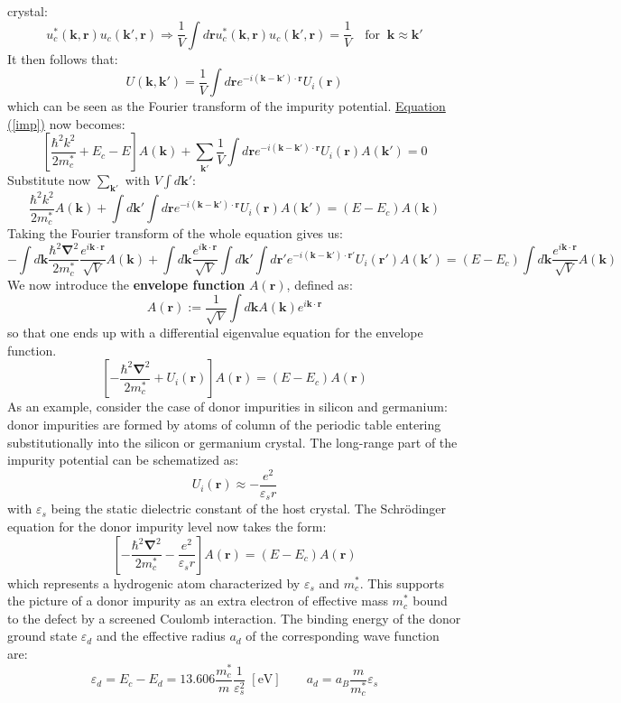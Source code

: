 \documentclass[10.75pt,a4paper,openright,bottom=2cm]{article}
\renewcommand{\Vec}[1]{\boldsymbol{#1}}
\renewcommand{\refeq}[1]{\hyperref[#1]{Equation (\ref{#1})}}
\newcommand{\RN}[1]{%
  \textup{\uppercase\expandafter{\romannumeral#1}}%
}
\begin{document}
crystal:
\[
u_c^*(\Vec{k},\Vec{r})u_c(\Vec{k'},\Vec{r})\Rightarrow\frac{1}{V}\int d\Vec{r}u_c^*(\Vec{k},\Vec{r})u_c(\Vec{k'},\Vec{r})=\frac{1}{V} \quad\text{for}\;\;\Vec{k}\approx\Vec{k'}
\]
It then follows that:
\[
U(\Vec{k},\Vec{k'})=\frac{1}{V}\int d\Vec{r}e^{-i(\Vec{k}-\Vec{k'})\cdot\Vec{r}}U_i(\Vec{r})
\]
which can be seen as the Fourier transform of the impurity potential. \refeq{imp} now becomes:
\[
\left[\frac{\hbar^2k^2}{2m_c^*}+E_c-E\right]A(\Vec{k})+\sum_{\Vec{k'}}\frac{1}{V}\int d\Vec{r}e^{-i(\Vec{k}-\Vec{k'})\cdot\Vec{r}}U_i(\Vec{r})A(\Vec{k'})=0
\]
Substitute now $\sum_{\Vec{k'}}$ with $V\int d\Vec{k'}$:
\[
\frac{\hbar^2k^2}{2m_c^*}A(\Vec{k})+\int d\Vec{k'}\int d\Vec{r}e^{-i(\Vec{k}-\Vec{k'})\cdot\Vec{r}}U_i(\Vec{r})A(\Vec{k'})=(E-E_c)A(\Vec{k})
\]
Taking the Fourier transform of the whole equation gives us:
\[
-\int d\Vec{k}\frac{\hbar^2\Vec{\nabla}^2}{2m_c^*}\frac{e^{i\Vec{k}\cdot\Vec{r}}}{\sqrt{V}}A(\Vec{k})+\int d\Vec{k}\frac{e^{i\Vec{k}\cdot\Vec{r}}}{\sqrt{V}}\int d\Vec{k'}\int d\Vec{r'}e^{-i(\Vec{k}-\Vec{k'})\cdot\Vec{r'}}U_i(\Vec{r'})A(\Vec{k'})=(E-E_c)\int d\Vec{k}\frac{e^{i\Vec{k}\cdot\Vec{r}}}{\sqrt{V}}A(\Vec{k})
\]
We now introduce the \textbf{envelope function} $A(\Vec{r})$, defined as:
\[
A(\Vec{r}):=\frac{1}{\sqrt{V}}\int d\Vec{k}A(\Vec{k})e^{i\Vec{k}\cdot\Vec{r}}
\]
so that one ends up with a differential eigenvalue equation for the envelope function.
\[
\left[-\frac{\hbar^2\Vec{\nabla}^2}{2m_c^*}+U_i(\Vec{r})\right]A(\Vec{r})=(E-E_c)A(\Vec{r})
\]
As an example, consider the case of donor impurities in silicon and germanium: donor impurities are formed by atoms of column \RN{5} of the periodic table entering substitutionally into the silicon or germanium crystal. The long-range part of the impurity potential can be schematized as:
\[
U_i(\Vec{r})\approx-\frac{e^2}{\varepsilon_sr}
\]
with $\varepsilon_s$ being the static dielectric constant of the host crystal. The Schr\"odinger equation for the donor impurity level now takes the form:
\[
\left[-\frac{\hbar^2\Vec{\nabla}^2}{2m_c^*}-\frac{e^2}{\varepsilon_sr}\right]A(\Vec{r})=(E-E_c)A(\Vec{r})
\]
which represents a hydrogenic atom characterized by $\varepsilon_s$ and $m_c^*$. This supports the picture of a donor impurity as an extra electron of effective mass $m_c^*$ bound to the defect by a screened Coulomb interaction. The binding energy of the donor ground state $\varepsilon_d$ and the effective radius $a_d$ of the corresponding wave function are:
\[
\varepsilon_d=E_c-E_d=13.606\frac{m_c^*}{m}\frac{1}{\varepsilon_s^2}\;[\text{eV}] \qquad a_d=a_B\frac{m}{m_c^*}\varepsilon_s
\]
\end{document}
